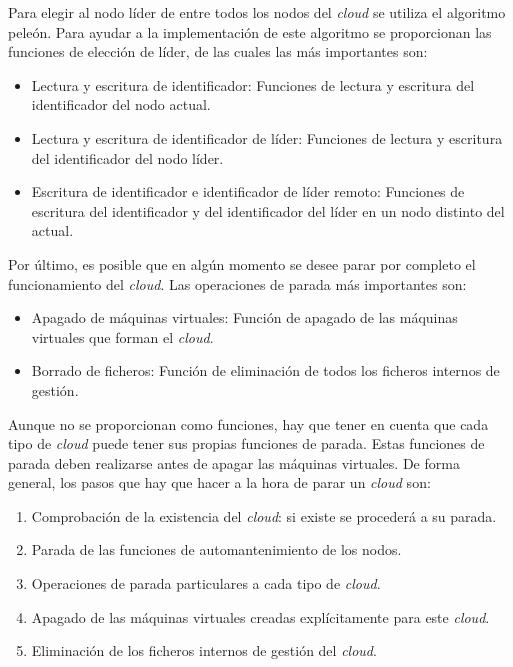 Para elegir al nodo líder de entre todos los nodos del \emph{cloud} se utiliza el algoritmo peleón. Para ayudar a la implementación de este algoritmo se proporcionan las funciones de elección de líder, de las cuales las más importantes son:

\begin{itemize}
\item Lectura y escritura de identificador: Funciones de lectura y escritura del identificador del nodo actual.
\item Lectura y escritura de identificador de líder: Funciones de lectura y escritura del identificador del nodo líder.
\item Escritura de identificador e identificador de líder remoto: Funciones de escritura del identificador y del identificador del líder en un nodo distinto del actual.
\end{itemize}

Por último, es posible que en algún momento se desee parar por completo el funcionamiento del \emph{cloud}. Las operaciones de parada más importantes son:

\begin{itemize}
\item Apagado de máquinas virtuales: Función de apagado de las máquinas virtuales que forman el \emph{cloud}.
\item Borrado de ficheros: Función de eliminación de todos los ficheros internos de gestión.
\end{itemize}

Aunque no se proporcionan como funciones, hay que tener en cuenta que cada tipo de \emph{cloud} puede tener sus propias funciones de parada. Estas funciones de parada deben realizarse antes de apagar las máquinas virtuales. De forma general, los pasos que hay que hacer a la hora de parar un \emph{cloud} son:

\begin{enumerate}
\item Comprobación de la existencia del \emph{cloud}: si existe se procederá a su parada.
\item Parada de las funciones de automantenimiento de los nodos.
\item Operaciones de parada particulares a cada tipo de \emph{cloud}.
\item Apagado de las máquinas virtuales creadas explícitamente para este \emph{cloud}.
\item Eliminación de los ficheros internos de gestión del \emph{cloud}.
\end{enumerate}


